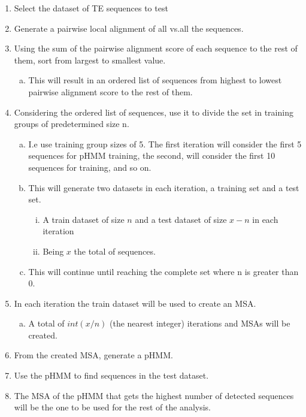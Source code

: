 \documentclass[unnumsec,webpdf,contemporary,large]{oup-authoring-template}%
\theoremstyle{thmstyleone}%
\theoremstyle{thmstyletwo}%
\theoremstyle{thmstylethree}%
\begin{document}
\begin{enumerate}[1.]
\item Select the dataset of  TE sequences to test
\item Generate a pairwise local alignment of all vs.\@ all the sequences. 
\item Using the sum of the pairwise alignment score of each sequence to the rest
of them, sort from largest to smallest value.
\begin{enumerate}[(a)]
    \item This will result in an ordered list of sequences from highest to
    lowest pairwise alignment score to the rest of them.
\end{enumerate}
\item Considering the ordered list of sequences, use it to divide the set in
training groups of predetermined size n.

\begin{enumerate}[(a)]
    \item I.e use training group sizes of 5. The first iteration will consider
    the first 5 sequences for pHMM training, the second, will consider the first
    10 sequences for training, and so on.
    \item This will generate two datasets in each iteration, a training set and
    a test set.
        \begin{enumerate}[(ii)]
            \item A train dataset of size $n$ and a test dataset of size $x-n$
            in each iteration
            \item Being $x$ the total of sequences.
        \end{enumerate}
    \item This will continue until reaching the complete set where n is greater
    than 0.
\end{enumerate}

\item In each iteration the train dataset will be used to create an MSA.\@
\begin{enumerate}[(a)]
    \item A total of $int(x/n)$ (the nearest integer) iterations and MSAs will
    be created.
\end{enumerate}
\item From the created MSA, generate a pHMM.\@
\item Use the pHMM to find sequences in the test dataset.
\item The MSA of the pHMM that gets the highest number of detected sequences
will be the one to be used for the rest of the analysis.
\end{enumerate}
\end{document}
